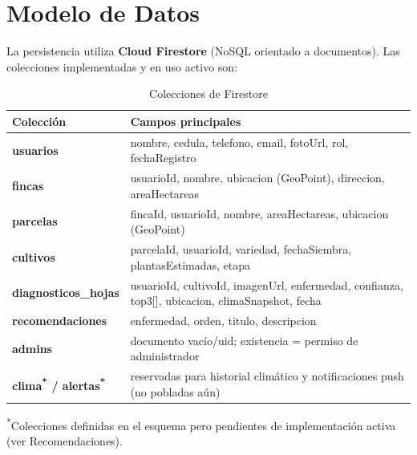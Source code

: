 \documentclass[12pt,a4paper]{article}
\begin{document}
\section{Modelo de Datos}

La persistencia utiliza \textbf{Cloud Firestore} (NoSQL orientado a
documentos). Las colecciones implementadas y en uso activo son:

\begin{table}[H]
\centering
\caption{Colecciones de Firestore}
\label{tab:firestore}
\renewcommand{\arraystretch}{1.3}
\begin{tabular}{>{\ttfamily\bfseries}p{3.6cm} p{9.5cm}}
\toprule
\normalfont\bfseries Colección & \bfseries\normalfont Campos principales \\
\midrule
usuarios          & nombre, cedula, telefono, email, fotoUrl, rol, fechaRegistro \\
fincas            & usuarioId, nombre, ubicacion (GeoPoint), direccion, areaHectareas \\
parcelas          & fincaId, usuarioId, nombre, areaHectareas, ubicacion (GeoPoint) \\
cultivos          & parcelaId, usuarioId, variedad, fechaSiembra, plantasEstimadas, etapa \\
diagnosticos\_hojas & usuarioId, cultivoId, imagenUrl, enfermedad, confianza, top3[], ubicacion, climaSnapshot, fecha \\
recomendaciones   & enfermedad, orden, titulo, descripcion \\
admins            & documento vacío/uid; existencia = permiso de administrador \\
clima\textsuperscript{*} / alertas\textsuperscript{*} & reservadas para historial climático y notificaciones push (no pobladas aún) \\
\bottomrule
\end{tabular}
\end{table}
{\footnotesize\textsuperscript{*}Colecciones definidas en el esquema pero
pendientes de implementación activa (ver Recomendaciones).}
\end{document}
